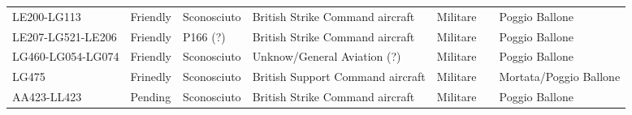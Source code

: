 \documentclass[
]{article}
\begin{document}
\begin{longtable}[]{@{}lllllll@{}}
LE200-LG113 & Friendly & Sconosciuto & British Strike Command aircraft &
Militare & & Poggio Ballone \\
LE207-LG521-LE206 & Friendly & P166 (?) & British Strike Command
aircraft & Militare & & Poggio Ballone \\
LG460-LG054-LG074 & Friendly & Sconosciuto & Unknow/General Aviation (?)
& Militare & & Poggio Ballone \\
LG475 & Frinedly & Sconosciuto & British Support Command aircraft &
Militare & & Mortata/Poggio Ballone \\
AA423-LL423 & Pending & Sconosciuto & British Strike Command aircraft &
Militare & & Poggio Ballone \\
\bottomrule
\end{longtable}
\end{document}
